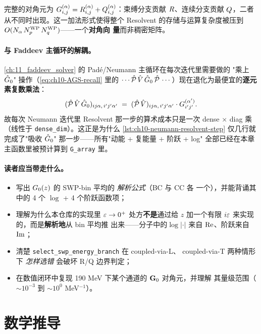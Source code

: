 完整的对角元为 \(G_{i,j}^{(\alpha)} = R_{i,j}^{(\alpha)} + Q_{i,j}^{(\alpha)}\)：束缚分支贡献
\(R\)、连续分支贡献 \(Q\)，二者从不同时出现。这一加法形式使得整个
Resolvent 的存储与运算复杂度被压到 \(O(N_\alpha\, {N_{p}^{\text{WP}}}\, {N_{q}^{\text{WP}}})\)——一个\textbf{对角向
量}而非稠密矩阵。

\paragraph{与 Faddeev 主循环的解耦。}
\cref{ch:11_faddeev_solver} 的 Padé/Neumann 主循环在每次迭代里需要做的
"乘上 \(\hat{G}_0\)" 操作（\cref{eq:ch10-AGS-recall} 里的 \(\cdots \hat{\mathcal{P}}\, \hat{V}\,
\hat{G}_0\, \hat{\mathcal{P}}\, \cdots\)）现在退化为最便宜的\textbf{逐元素复数乘法}：
\begin{equation}
\label{eq:ch10-elementwise-multiply}
(\hat{\mathcal{P}}\,\hat{V}\,\hat{G}_0)_{ij\alpha,\,i'j'\alpha'}
\;=\;
(\hat{\mathcal{P}}\,\hat{V})_{ij\alpha,\,i'j'\alpha'} \cdot G_{i'j'}^{(\alpha')}.
\end{equation}
故每次 Neumann 迭代里 Resolvent 那一步的算术成本只是一次 dense × diag 乘
（线性于 \texttt{dense\_dim}）。这正是为什么 \cref{lst:ch10-neumann-resolvent-step}
仅几行就完成了"吸收 \(\hat{G}_0\)" 那一步——所有"动能 + 复能量 + 阶跃 + log"
全部已经在本章主函数里被预计算到 \texttt{G\_array} 里。

\paragraph{读者应当带走什么。}
\begin{itemize}
  \item 写出 \(G_0(z)\) 的 SWP-bin 平均的 \emph{解析公式}（BC 与 CC 各
        一个），并能背诵其中的 4 个 \(\log\) + 4 个阶跃函数项；
  \item 理解为什么本仓库的实现里 \(\varepsilon \to 0^{+}\) 处方\textbf{不是}通过给
        \(z\) 加一个有限 \(i\varepsilon\) 来实现的，而是\textbf{解析地}从 bin 平均推
        出来——分子中的\(\log|\cdot|\) 来自 \(\operatorname{Re}\)、阶跃来自 \(\operatorname{Im}\)；
  \item 清楚 \texttt{select\_swp\_energy\_branch} 在 coupled-via-L、
        coupled-via-T 两种情形下 \emph{怎样选错} 会破坏 R/Q 边界判定；
  \item 在数值闭环中复现 190 MeV 下某个通道的 \(\mathbf{G}_0\) 对角元，并理解
        其量级范围（\(\sim 10^{-3}\) 到 \(\sim 10^{0}\) MeV\(^{-1}\)）。
\end{itemize}

\section{数学推导}
\label{sec:ch10-math}

